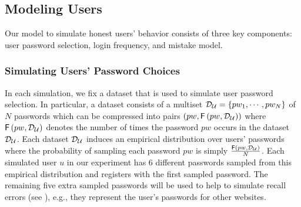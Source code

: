 
\vspace*{-\baselineskip}
\subsection{Modeling Users} \label{section:ExperimentDesign-subsection:SimulateUser}

Our model to simulate honest users' behavior consists of three key components: user password selection, login frequency, and mistake model. 





\subsubsection{Simulating Users’ Password Choices}\label{section:ExperimentDesign-subsection:SimulateUser-subsubsection:SimulatePasswordChoice}

In each simulation, we fix a dataset that is used to simulate user password selection. In particular, a dataset consists of a multiset $\mathcal{D}_{{\mathcal{U}}} = \{pw_1,\cdots,pw_N\}$ of $N$ passwords which can be compressed into pairs $(pw,  \mathsf{F}\left(pw, \mathcal{D}_{{\mathcal{U}}} \right))$ where $\mathsf{F}\left(pw, \mathcal{D}_{{\mathcal{U}}} \right)$ denotes the number of times the password $pw$ occurs in the dataset $\mathcal{D}_{{\mathcal{U}}}$. Each dataset $\mathcal{D}_{{\mathcal{U}}} $ induces an empirical distribution over users’ passwords where the probability of sampling each password $pw$ is simply $\frac{\mathsf{F}\left(pw, \mathcal{D}_{{\mathcal{U}}}\right)}{N}$. Each simulated user $u$ in our experiment has 6 different passwords sampled from this empirical distribution and registers with the first sampled password. The remaining five extra sampled passwords will be used to help to simulate recall errors (see ), e.g., they represent the user's passwords for other websites. 




